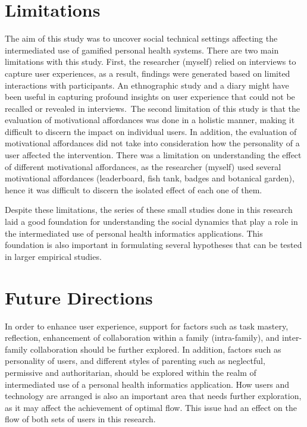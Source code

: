 \section{Limitations}
The aim of this study was to uncover social technical settings affecting the intermediated use of gamified personal health systems. There are two main limitations with this study. First, the researcher (myself) relied on interviews to capture user experiences, as a result, findings were generated based on limited interactions with participants. An ethnographic study and a diary might have been useful in capturing profound insights on user experience that could not be recalled or revealed in interviews.~The second limitation of this study is that the evaluation of motivational affordances was done in a holistic manner, making it difficult to discern the impact on individual users. In addition, the evaluation of motivational affordances did not take into consideration how the personality of a user affected the intervention. There was a limitation on understanding the effect of different motivational affordances, as the researcher (myself) used several motivational affordances (leaderboard, fish tank, badges and botanical garden), hence it was difficult to discern the isolated effect of each one of them.   

Despite these limitations, the series of these small studies done in this research laid a good foundation for understanding the social dynamics that play a role in the intermediated use of personal health informatics applications. This foundation is also important in formulating several hypotheses that can be tested in larger empirical studies. 

\section{Future Directions}
In order to enhance user experience, support for factors such as task mastery, reflection, enhancement of collaboration within a family (intra-family), and inter-family collaboration should be further explored. In addition, factors such as personality of users, and different styles of parenting such as neglectful, permissive and authoritarian, should be explored within the realm of intermediated use of a personal health informatics application. How users and technology are arranged is also an important area that needs further exploration, as it may affect the achievement of optimal flow. This issue had an effect on the flow of both sets of users in this research. 

